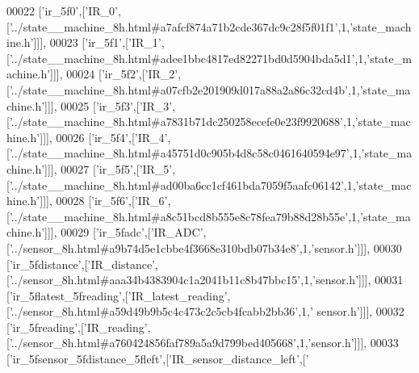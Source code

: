 \begin{DoxyCode}
00022   [\textcolor{stringliteral}{'ir\_5f0'},[\textcolor{stringliteral}{'IR\_0'},[\textcolor{stringliteral}{'../state\_\_machine\_8h.html#a7afcf874a71b2cde367dc9c28f5f01f1'},1,\textcolor{stringliteral}{'state\_machine.h'}]]],
00023   [\textcolor{stringliteral}{'ir\_5f1'},[\textcolor{stringliteral}{'IR\_1'},[\textcolor{stringliteral}{'../state\_\_machine\_8h.html#adee1bbc4817ed82271bd0d5904bda5d1'},1,\textcolor{stringliteral}{'state\_machine.h'}]]],
00024   [\textcolor{stringliteral}{'ir\_5f2'},[\textcolor{stringliteral}{'IR\_2'},[\textcolor{stringliteral}{'../state\_\_machine\_8h.html#a07cfb2e201909d017a88a2a86c32cd4b'},1,\textcolor{stringliteral}{'state\_machine.h'}]]],
00025   [\textcolor{stringliteral}{'ir\_5f3'},[\textcolor{stringliteral}{'IR\_3'},[\textcolor{stringliteral}{'../state\_\_machine\_8h.html#a7831b71dc250258ecefe0e23f9920688'},1,\textcolor{stringliteral}{'state\_machine.h'}]]],
00026   [\textcolor{stringliteral}{'ir\_5f4'},[\textcolor{stringliteral}{'IR\_4'},[\textcolor{stringliteral}{'../state\_\_machine\_8h.html#a45751d0c905b4d8c58c0461640594e97'},1,\textcolor{stringliteral}{'state\_machine.h'}]]],
00027   [\textcolor{stringliteral}{'ir\_5f5'},[\textcolor{stringliteral}{'IR\_5'},[\textcolor{stringliteral}{'../state\_\_machine\_8h.html#ad00ba6cc1cf461bda7059f5aafc06142'},1,\textcolor{stringliteral}{'state\_machine.h'}]]],
00028   [\textcolor{stringliteral}{'ir\_5f6'},[\textcolor{stringliteral}{'IR\_6'},[\textcolor{stringliteral}{'../state\_\_machine\_8h.html#a8c51bcd8b555e8c78fea79b88d28b55e'},1,\textcolor{stringliteral}{'state\_machine.h'}]]],
00029   [\textcolor{stringliteral}{'ir\_5fadc'},[\textcolor{stringliteral}{'IR\_ADC'},[\textcolor{stringliteral}{'../sensor\_8h.html#a9b74d5e1cbbe4f3668e310bdb07b34e8'},1,\textcolor{stringliteral}{'sensor.h'}]]],
00030   [\textcolor{stringliteral}{'ir\_5fdistance'},[\textcolor{stringliteral}{'IR\_distance'},[\textcolor{stringliteral}{'../sensor\_8h.html#aaa34b4383904c1a2041b11c8b47bbc15'},1,\textcolor{stringliteral}{'sensor.h'}]]],
00031   [\textcolor{stringliteral}{'ir\_5flatest\_5freading'},[\textcolor{stringliteral}{'IR\_latest\_reading'},[\textcolor{stringliteral}{'../sensor\_8h.html#a59d49b9b5c4c473c2c5cb4fcabb2bb36'},1,\textcolor{stringliteral}{'
      sensor.h'}]]],
00032   [\textcolor{stringliteral}{'ir\_5freading'},[\textcolor{stringliteral}{'IR\_reading'},[\textcolor{stringliteral}{'../sensor\_8h.html#a760424856faf789a5a9d799bed405668'},1,\textcolor{stringliteral}{'sensor.h'}]]],
00033   [\textcolor{stringliteral}{'ir\_5fsensor\_5fdistance\_5fleft'},[\textcolor{stringliteral}{'IR\_sensor\_distance\_left'},[\textcolor{stringliteral}{'
}
\end{DoxyCode}
